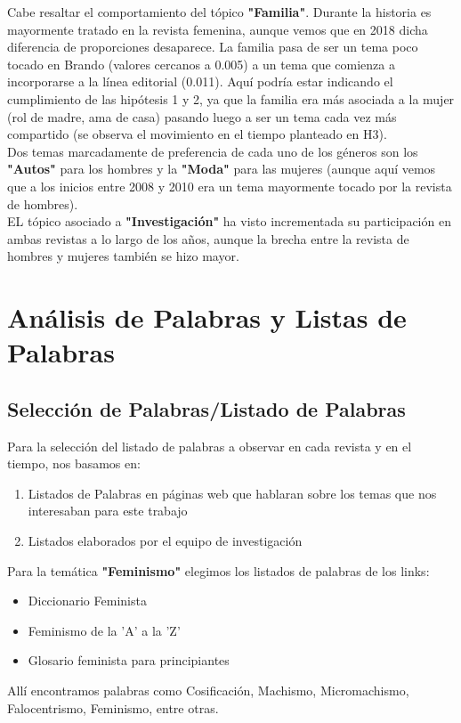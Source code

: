 \documentclass[a4paper]{article}
\begin{document}
Cabe resaltar el comportamiento del t\'opico \textbf{"Familia"}. Durante la historia es mayormente tratado en la revista femenina, aunque vemos que en 2018 dicha diferencia de proporciones desaparece. La familia pasa de ser un tema poco tocado en Brando (valores cercanos a 0.005) a un tema que comienza a incorporarse a la l\'inea editorial (0.011). Aqu\'i podr\'ia estar indicando el cumplimiento de las hip\'otesis 1 y 2, ya que la familia era m\'as asociada a la mujer (rol de madre, ama de casa) pasando luego a ser un tema cada vez m\'as compartido (se observa el movimiento en el tiempo planteado en H3).\\

Dos temas marcadamente de preferencia de cada uno de los g\'eneros son los \textbf{"Autos"} para los hombres y la \textbf{"Moda"} para las mujeres (aunque aqu\'i vemos que a los inicios entre 2008 y 2010 era un tema mayormente tocado por la revista de hombres).\\

EL t\'opico asociado a \textbf{"Investigaci\'on"} ha visto incrementada su participaci\'on en ambas revistas a lo largo de los a\~nos, aunque la brecha entre la revista de hombres y mujeres tambi\'en se hizo mayor.


\section{An\'alisis de Palabras y Listas de Palabras}

\subsection{Selecci\'on de Palabras/Listado de Palabras}

Para la selecci\'on del listado de palabras a observar en cada revista y en el tiempo, nos basamos en:

\begin{enumerate}
\item Listados de Palabras en p\'aginas web que hablaran sobre los temas que nos interesaban para este trabajo
\item Listados elaborados por el equipo de investigaci\'on
\end{enumerate}

Para la tem\'atica \textbf{"Feminismo"} elegimos los listados de palabras de los links:
\begin{itemize}
\item Diccionario Feminista \cite{diccfeminista}
\item Feminismo de la 'A' a la 'Z' \cite{feminismoaz}
\item Glosario feminista para principiantes \cite{glosariofemin}
\end{itemize}
All\'i encontramos palabras como Cosificaci\'on, Machismo, Micromachismo, Falocentrismo, Feminismo, entre otras.\\
\end{document}
